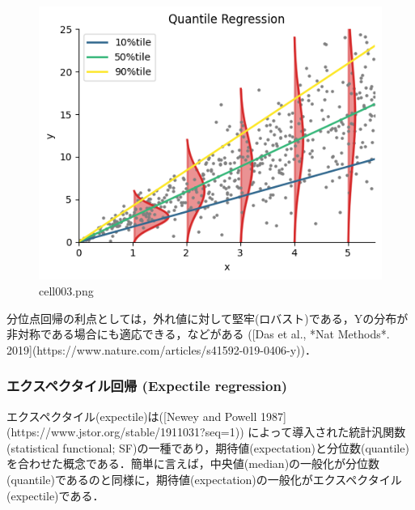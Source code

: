 \begin{figure}[ht]
	\centering
	\includegraphics[scale=0.8, max width=\linewidth]{./fig/bayesian-brain/quantile-expectile-regression/cell003.png}
	\caption{cell003.png}
	\label{cell003.png}
\end{figure}
分位点回帰の利点としては，外れ値に対して堅牢(ロバスト)である，Yの分布が非対称である場合にも適応できる，などがある ([Das et al., *Nat Methods*. 2019](https://www.nature.com/articles/s41592-019-0406-y))．
\subsubsection{エクスペクタイル回帰 (Expectile regression)}
エクスペクタイル(expectile)は([Newey and Powell 1987](https://www.jstor.org/stable/1911031?seq=1)) によって導入された統計汎関数 (statistical functional; SF)の一種であり，期待値(expectation)と分位数(quantile)を合わせた概念である．簡単に言えば，中央値(median)の一般化が分位数(quantile)であるのと同様に，期待値(expectation)の一般化がエクスペクタイル(expectile)である．

